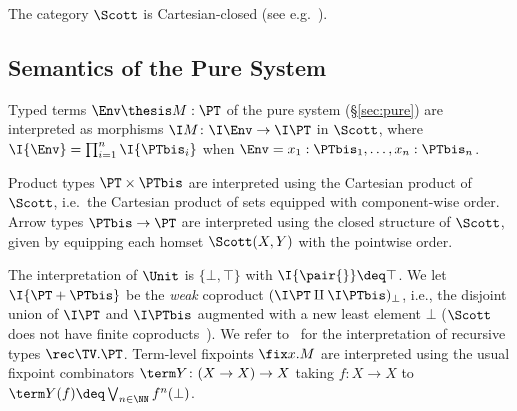 The category $\Scott$ is Cartesian-closed
(see e.g.\ \cite[Corollary 4.1.6]{aj95chapter}).





\subsection{Semantics of the Pure System}
\label{sec:sem:pure}

Typed terms $\Env \thesis M : \PT$ of the pure system (\S\ref{sec:pure})
are interpreted as morphisms $\I M \colon \I\Env \to \I\PT$ in $\Scott$,
where $\I{\Env} = \prod_{i=1}^n\I{\PTbis_i}$ when
$\Env = x_1:\PTbis_1,\dots,x_n:\PTbis_n$.%
%
%

Product types $\PT \times \PTbis$ are interpreted using
the Cartesian product of $\Scott$, i.e.\ the Cartesian product
of sets equipped with component-wise order.
%
Arrow types $\PTbis \to \PT$ are interpreted using the
closed structure of $\Scott$,
given by equipping each homset $\Scott(X,Y)$ with the pointwise order.

The interpretation of $\Unit$ is $\{\bot, \top\}$
with $\I{\pair{}} \deq \top$.
We let $\I{\PT + \PTbis}$ be the \emph{weak} coproduct
$(\I\PT \amalg \I\PTbis)_\bot$,
i.e.,
the disjoint union of $\I\PT$ and $\I\PTbis$ augmented with a new least element $\bot$
($\Scott$ does not have finite coproducts~\cite{hp90tcs}).
%
We refer to~\cite{ac98book,aj95chapter,streicher06book}
for the interpretation of recursive types $\rec\TV.\PT$.
%
Term-level fixpoints $\fix x.M$ are interpreted
using the usual fixpoint combinators $\term Y \colon (X \to X) \to X$
taking $f \colon X \to X$ to $\term Y(f) \deq \bigvee_{n \in \NN} f^n(\bot)$.



